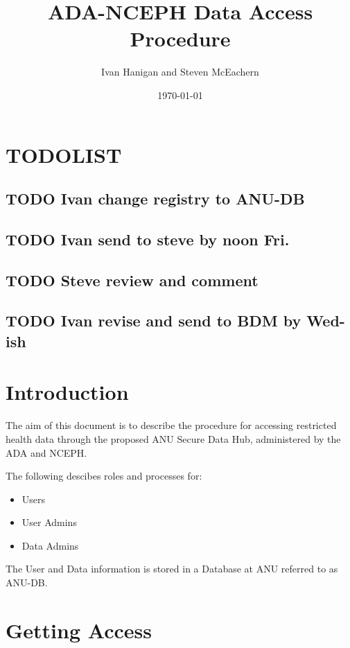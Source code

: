 \documentclass[a4paper]{article}
\title{ADA-NCEPH Data Access Procedure}
\author{Ivan Hanigan and Steven McEachern}
\date{\today}
\begin{document}
\maketitle

\tableofcontents

\clearpage
\section{TODOLIST}
\label{sec-1}
\subsection{\textbf{TODO} Ivan change registry to ANU-DB}
\label{sec-1-1}
\subsection{\textbf{TODO} Ivan send to steve by noon Fri.}
\label{sec-1-2}
\subsection{\textbf{TODO} Steve review and comment}
\label{sec-1-3}
\subsection{\textbf{TODO} Ivan revise and send to BDM by Wed-ish}
\label{sec-1-4}
\section{Introduction}
\label{sec-2}

The aim of this document is to describe the procedure for accessing restricted health data through the proposed ANU Secure Data Hub, administered by the ADA and NCEPH.

The following descibes roles and processes for:
\begin{itemize}
\item Users
\item User Admins
\item Data Admins
\end{itemize}

The User and Data information is stored in a Database at ANU referred to as ANU-DB.
\section{Getting Access}
\label{sec-3}

  
\end{document}
